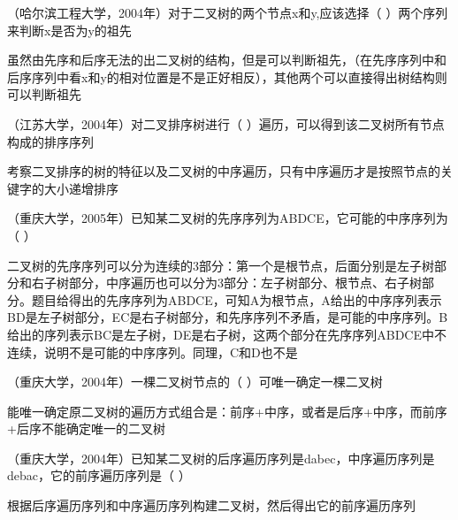 \question （哈尔滨工程大学，2004年）对于二叉树的两个节点x和y,应该选择（
）两个序列来判断x是否为y的祖先
\par{}
\begin{solution}虽然由先序和后序无法的出二叉树的结构，但是可以判断祖先，（在先序序列中和后序序列中看x和y的相对位置是不是正好相反），其他两个可以直接得出树结构则可以判断祖先
\end{solution}
\question （江苏大学，2004年）对二叉排序树进行（
）遍历，可以得到该二叉树所有节点构成的排序序列
\par{}
\begin{solution}考察二叉排序的树的特征以及二叉树的中序遍历，只有中序遍历才是按照节点的关键字的大小递增排序
\end{solution}
\question （重庆大学，2005年）已知某二叉树的先序序列为ABDCE，它可能的中序序列为（
）
\par{}
\begin{solution}二叉树的先序序列可以分为连续的3部分：第一个是根节点，后面分别是左子树部分和右子树部分，中序遍历也可以分为3部分：左子树部分、根节点、右子树部分。题目给得出的先序序列为ABDCE，可知A为根节点，A给出的中序序列表示BD是左子树部分，EC是右子树部分，和先序序列不矛盾，是可能的中序序列。B给出的序列表示BC是左子树，DE是右子树，这两个部分在先序序列ABDCE中不连续，说明不是可能的中序序列。同理，C和D也不是
\end{solution}
\question （重庆大学，2004年）一棵二叉树节点的（ ）可唯一确定一棵二叉树
\par{}
\begin{solution}能唯一确定原二叉树的遍历方式组合是：前序+中序，或者是后序+中序，而前序+后序不能确定唯一的二叉树
\end{solution}
\question （重庆大学，2004年）已知某二叉树的后序遍历序列是dabec，中序遍历序列是debac，它的前序遍历序列是（
）
\par{}
\begin{solution}根据后序遍历序列和中序遍历序列构建二叉树，然后得出它的前序遍历序列
\end{solution}
